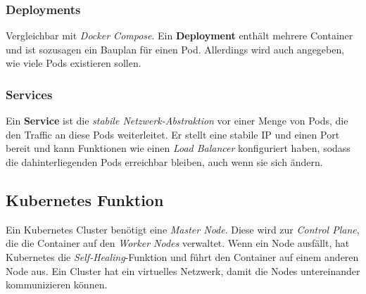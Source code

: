 \subsubsection{Deployments}
Vergleichbar mit \textit{Docker Compose}. Ein \textbf{Deployment} enthält mehrere Container und ist sozusagen ein Bauplan für einen Pod. Allerdings wird auch angegeben, wie viele Pods existieren sollen.

\subsubsection{Services}
Ein \textbf{Service} ist die \emph{stabile Netzwerk-Abstraktion} vor einer Menge von Pods, die den Traffic an diese Pods weiterleitet. Er stellt eine stabile IP und einen Port bereit und kann Funktionen wie einen \textit{Load Balancer} konfiguriert haben, sodass die dahinterliegenden Pods erreichbar bleiben, auch wenn sie sich ändern.

\subsection{Kubernetes Funktion}
Ein Kubernetes Cluster benötigt eine \textit{Master Node}. Diese wird zur \textit{Control Plane}, die die Container auf den \textit{Worker Nodes} verwaltet. Wenn ein Node ausfällt, hat Kubernetes die \textit{Self-Healing}-Funktion und führt den Container auf einem anderen Node aus. Ein Cluster hat ein virtuelles Netzwerk, damit die Nodes untereinander kommunizieren können.